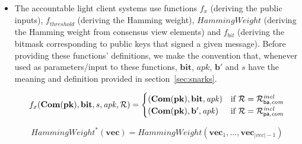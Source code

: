 \begin{itemize}
\item The accountable light client systems use functions $f_x$ (deriving the public inputs), 
$\mathit{f_{\mathit{threshold}}}$ (deriving the Hamming weight), $\mathit{HammingWeight}$ (deriving the Hamming 
weight from consensus view elements) and $f_{\mathit{bit}}$ (deriving the bitmask corresponding to public keys that 
signed a given message). Before providing these functions' definitions, we make the convention that, 
whenever used as parameters/input to these functions, $\mathbf{bit}$, $\mathit{apk}$, $\mathbf{b'}$ and $s$ have 
the meaning and definition provided in section~\ref{sec:snarks}. 

\begin{equation*}
 f_x (\mathbf{Com}(\mathbf{pk}), \mathbf{bit}, s,\mathit{apk}, \mathcal{R}) =
   \begin{cases}
    (\mathbf{Com}(\mathbf{pk}), \mathbf{bit}, \mathit{apk}) & \text{if } \mathcal{R} = \mathcal{R}^{\mathit{incl}}_{\mathsf{ba},\mathit{com}} \\
     (\mathbf{Com}(\mathbf{pk}), \mathbf{b'}, \mathit{apk}) & \text{if } \mathcal{R} = \mathcal{R}^{\mathit{incl}}_{\mathsf{pa},\mathit{com}} \\
  \end{cases}       
\end{equation*}


\begin{equation*}
\mathit{HammingWeight^*}(\mathbf{vec}) = \mathit{HammingWeight}(\mathbf{vec}_{1}, \ldots, \mathbf{vec}_{|\mathit{vec}| - 1})
\end{equation*}



\end{itemize}
